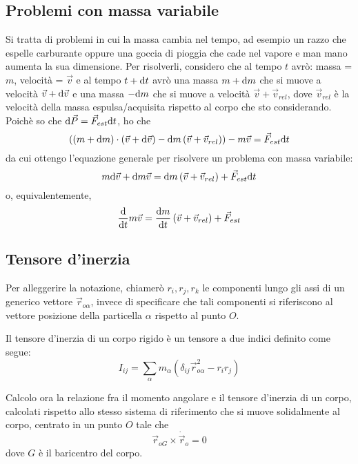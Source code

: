 \documentclass[../main.tex]{subfiles}
\begin{document}
\subsection{Problemi con massa variabile}
Si tratta di problemi in cui la massa cambia nel tempo, ad esempio un razzo che espelle carburante oppure una goccia di pioggia che cade nel vapore e man mano aumenta la sua dimensione.
Per risolverli, considero che al tempo $t$ avrò:
massa = $m$, velocità = $\vec v$
e al tempo $t+\mathrm{d} t$ avrò una massa $m+\mathrm{d} m$ che si muove a velocità $\vec v + \mathrm{d} \vec v$ e una massa $-\mathrm{d} m$ che si muove a velocità $\vec v + \vec v_{rel}$, dove $\vec v_{rel}$ è la velocità della massa espulsa/acquisita rispetto al corpo che sto considerando.
Poichè so che $\mathrm{d} \vec P = \vec F_{est} \mathrm{d} t$, ho che
$$ \left ( \left ( m + \mathrm{d} m \right ) \cdot \left ( \vec v + \mathrm{d} \vec v\right ) -\mathrm{d} m\left ( \vec v + \vec v_{rel} \right ) \right ) - m\vec v = \vec F_{est}\mathrm{d} t$$
da cui ottengo l'equazione generale per risolvere un problema con massa variabile:
\begin{equation}\label{MassaVariabile}
	m \mathrm{d} \vec v + \mathrm{d} m \vec v = \mathrm{d} m \left ( \vec v + \vec v_{rel} \right ) + \vec F_{est} \mathrm{d} t
\end{equation}
o, equivalentemente,
\begin{equation}
	\frac{\mathrm{d} }{\mathrm{d} t} m\vec v = \frac{\mathrm{d} m}{\mathrm{d} t}\left ( \vec v + \vec v_{rel} \right ) + \vec F_{est}
\end{equation}



\subsection{Tensore d'inerzia}
Per alleggerire la notazione, chiamerò $r_i, r_j, r_k$ le componenti lungo gli assi di un generico vettore $\vec r_{o\alpha}$, invece di specificare che tali componenti si riferiscono al vettore posizione della particella $\alpha$ rispetto al punto $O$.

Il tensore d'inerzia di un corpo rigido è un tensore a due indici definito come segue:
\begin{equation} \label{ten:definizione}
	I_{ij}=\sum_\alpha m_\alpha(\delta_{ij}\vec r_{o\alpha}^2 -r_ir_j)
\end{equation}

Calcolo ora la relazione fra il momento angolare e il tensore d'inerzia di un corpo, calcolati rispetto allo stesso sistema di riferimento che si muove solidalmente al corpo, centrato in un punto $O$ tale che
\begin{equation} \label{ten:CondizioneSulCentro}
	\vec{r}_{oG}\times \dot{\vec r}_o=0
\end{equation}
dove $G$ è il baricentro del corpo.
\end{document}
